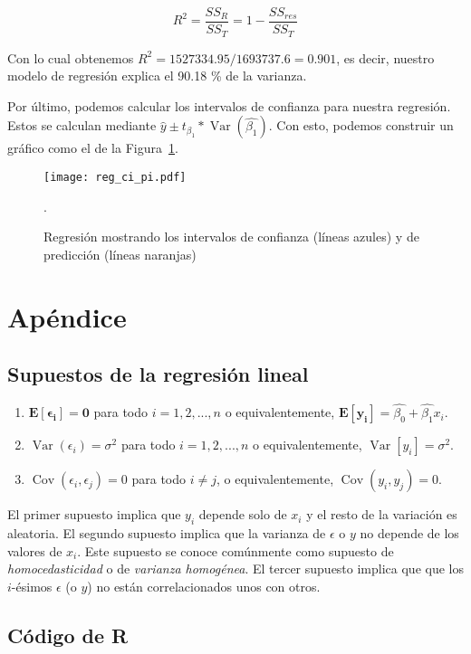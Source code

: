 \documentclass[letterpaper,12pt]{article}
\DeclareMathOperator{\Var}{\mathrm{Var}}
\DeclareMathOperator{\Cov}{\mathrm{Cov}}
\begin{document}
\begin{equation}
R^2 = \frac{SS_R}{SS_T} = 1 - \frac{SS_{res}}{SS_T} 
\end{equation}

Con lo cual obtenemos $R^2 = 1527334.95/1693737.6 = 0.901$, es decir, nuestro modelo de regresión explica el 90.18 \% de la varianza. 

Por último, podemos calcular los intervalos de confianza para nuestra regresión. Estos se calculan mediante $\hat{y}\pm t_{\beta_1}*\Var(\hat{\beta_1})$. Con esto, podemos construir un gráfico como el de la Figura~\ref{fig_3}.

\begin{figure}[H]
	\centering
	\texttt{[image: reg\_ci\_pi.pdf]}
	\caption{Regresión mostrando los intervalos de confianza (líneas azules) y de predicción (líneas naranjas)}. 
	\label{fig_3}
\end{figure}


\section*{Apéndice}

\subsection*{Supuestos de la regresión lineal}

\begin{enumerate}
	\item $\mathbf{E[\epsilon_i] = 0}$ para todo $i=1,2,...,n$ o equivalentemente, $\mathbf{E[y_i]}=\hat{\beta_0} + \hat{\beta_1}x_i$.
	\item $\Var(\epsilon_i)=\sigma^2$ para todo $i=1,2,...,n$ o equivalentemente, $\Var[y_i]=\sigma^2$.
	\item $\Cov(\epsilon_i,\epsilon_j)=0$ para todo $i\neq j$, o equivalentemente, $\Cov(y_i,y_j)=0$.

\end{enumerate}

El primer supuesto implica que $y_i$ depende solo de $x_i$ y el resto de la variación es aleatoria. El segundo supuesto implica que la varianza de $\epsilon$ o $y$ no depende de los valores de $x_i$. Este supuesto se conoce comúnmente como supuesto de \textit{homocedasticidad} o de \textit{varianza homogénea}. El tercer supuesto implica que que los $i$-ésimos $\epsilon$ (o $y$) no están correlacionados unos con otros. 

\subsection*{Código de R}
\end{document}
